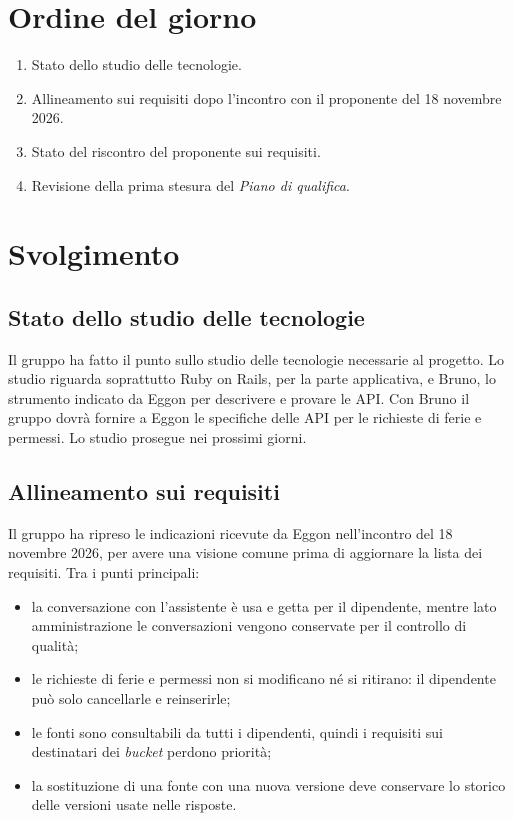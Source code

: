 \documentclass[interno]{gpt}
\begin{document}
\section{Ordine del giorno}
\begin{enumerate}
  \item Stato dello studio delle tecnologie.
  \item Allineamento sui requisiti dopo l'incontro con il proponente del 18 novembre 2026.
  \item Stato del riscontro del proponente sui requisiti.
  \item Revisione della prima stesura del \textit{Piano di qualifica}.
\end{enumerate}

\clearpage

\section{Svolgimento}

\subsection{Stato dello studio delle tecnologie}
Il gruppo ha fatto il punto sullo studio delle tecnologie necessarie al progetto.
Lo studio riguarda soprattutto Ruby on Rails, per la parte applicativa, e Bruno, lo strumento indicato da Eggon per descrivere e provare le API.
Con Bruno il gruppo dovrà fornire a Eggon le specifiche delle API per le richieste di ferie e permessi.
Lo studio prosegue nei prossimi giorni.

\subsection{Allineamento sui requisiti}
Il gruppo ha ripreso le indicazioni ricevute da Eggon nell'incontro del 18 novembre 2026, per avere una visione comune prima di aggiornare la lista dei requisiti.
Tra i punti principali:
\begin{itemize}
  \item la conversazione con l'assistente è usa e getta per il dipendente, mentre lato amministrazione le conversazioni vengono conservate per il controllo di qualità;
  \item le richieste di ferie e permessi non si modificano né si ritirano: il dipendente può solo cancellarle e reinserirle;
  \item le fonti sono consultabili da tutti i dipendenti, quindi i requisiti sui destinatari dei \textit{bucket} perdono priorità;
  \item la sostituzione di una fonte con una nuova versione deve conservare lo storico delle versioni usate nelle risposte.
\end{itemize}
\end{document}
